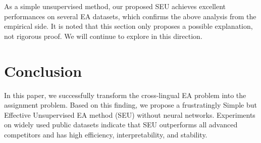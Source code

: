 \documentclass[11pt]{article}
\begin{document}
As a simple unsupervised method, our proposed SEU achieves excellent performances on several EA datasets, which confirms the above analysis from the empirical side.
It is noted that this section only proposes a possible explanation, not rigorous proof.
We will continue to explore in this direction.

\section{Conclusion}
In this paper, we successfully transform the cross-lingual EA problem into the assignment problem.
Based on this finding, we propose a frustratingly Simple but Effective Unsupervised EA method (SEU) without neural networks.
Experiments on widely used public datasets indicate that SEU outperforms all advanced competitors and has high efficiency, interpretability, and stability.

\balance

\end{document}

